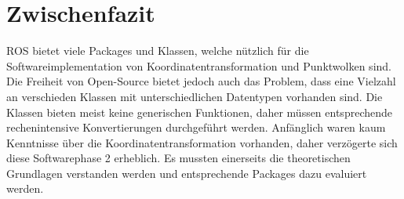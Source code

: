\section{Zwischenfazit}
\label{sec:ZwischenfazitReal}
ROS bietet viele Packages und Klassen, welche nützlich für die Softwareimplementation von Koordinatentransformation und Punktwolken sind. Die Freiheit von Open-Source bietet jedoch auch das Problem, dass eine Vielzahl an verschieden Klassen mit unterschiedlichen Datentypen vorhanden sind. Die Klassen bieten meist keine generischen Funktionen, daher müssen entsprechende rechenintensive Konvertierungen durchgeführt werden.  Anfänglich waren kaum Kenntnisse über die Koordinatentransformation vorhanden, daher verzögerte sich diese Softwarephase 2 erheblich. Es mussten einerseits die theoretischen Grundlagen verstanden werden und entsprechende Packages dazu evaluiert werden.


